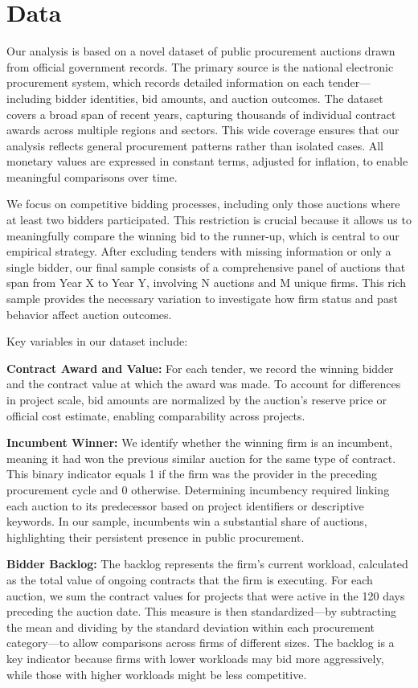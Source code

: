 \section{Data}\label{data}

Our analysis is based on a novel dataset of public procurement auctions drawn from official government records. The primary source is the national electronic procurement system, which records detailed information on each tender—including bidder identities, bid amounts, and auction outcomes. The dataset covers a broad span of recent years, capturing thousands of individual contract awards across multiple regions and sectors. This wide coverage ensures that our analysis reflects general procurement patterns rather than isolated cases. All monetary values are expressed in constant terms, adjusted for inflation, to enable meaningful comparisons over time.

We focus on competitive bidding processes, including only those auctions where at least two bidders participated. This restriction is crucial because it allows us to meaningfully compare the winning bid to the runner-up, which is central to our empirical strategy. After excluding tenders with missing information or only a single bidder, our final sample consists of a comprehensive panel of auctions that span from Year X to Year Y, involving N auctions and M unique firms. This rich sample provides the necessary variation to investigate how firm status and past behavior affect auction outcomes.

Key variables in our dataset include:

\textbf{Contract Award and Value:} For each tender, we record the winning bidder and the contract value at which the award was made. To account for differences in project scale, bid amounts are normalized by the auction's reserve price or official cost estimate, enabling comparability across projects.

\textbf{Incumbent Winner:} We identify whether the winning firm is an incumbent, meaning it had won the previous similar auction for the same type of contract. This binary indicator equals 1 if the firm was the provider in the preceding procurement cycle and 0 otherwise. Determining incumbency required linking each auction to its predecessor based on project identifiers or descriptive keywords. In our sample, incumbents win a substantial share of auctions, highlighting their persistent presence in public procurement.

\textbf{Bidder Backlog:} The backlog represents the firm's current workload, calculated as the total value of ongoing contracts that the firm is executing. For each auction, we sum the contract values for projects that were active in the 120 days preceding the auction date. This measure is then standardized—by subtracting the mean and dividing by the standard deviation within each procurement category—to allow comparisons across firms of different sizes. The backlog is a key indicator because firms with lower workloads may bid more aggressively, while those with higher workloads might be less competitive.

